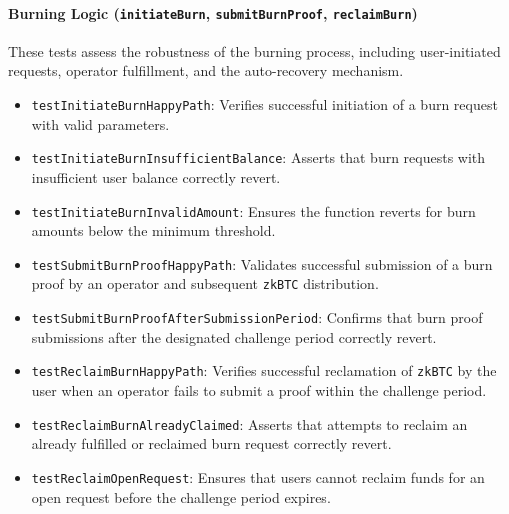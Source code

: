 \documentclass{DESSThesis}
\newcommand{\zktoken}{\texttt{zkBTC}}
\begin{document}
\paragraph{Burning Logic (\texttt{initiateBurn}, \texttt{submitBurnProof}, \texttt{reclaimBurn})}
These tests assess the robustness of the burning process, including user-initiated requests, operator fulfillment, and the auto-recovery mechanism.
\begin{itemize}
    \item \texttt{testInitiateBurnHappyPath}: Verifies successful initiation of a burn request with valid parameters.
    \item \texttt{testInitiateBurnInsufficientBalance}: Asserts that burn requests with insufficient user balance correctly revert.
    \item \texttt{testInitiateBurnInvalidAmount}: Ensures the function reverts for burn amounts below the minimum threshold.
    \item \texttt{testSubmitBurnProofHappyPath}: Validates successful submission of a burn proof by an operator and subsequent \texttt{\zktoken} distribution.
    \item \texttt{testSubmitBurnProofAfterSubmissionPeriod}: Confirms that burn proof submissions after the designated challenge period correctly revert.
    \item \texttt{testReclaimBurnHappyPath}: Verifies successful reclamation of \texttt{\zktoken} by the user when an operator fails to submit a proof within the challenge period.
    \item \texttt{testReclaimBurnAlreadyClaimed}: Asserts that attempts to reclaim an already fulfilled or reclaimed burn request correctly revert.
    \item \texttt{testReclaimOpenRequest}: Ensures that users cannot reclaim funds for an open request before the challenge period expires.
\end{itemize}
\end{document}
